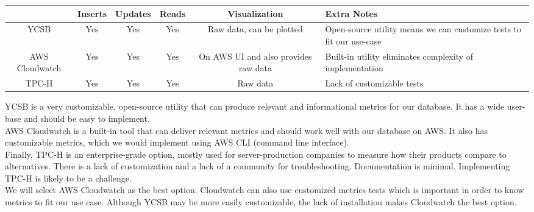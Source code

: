 \documentclass[10pt,draftclsnofoot,onecolumn,journal,compsoc]{IEEEtran}
\begin{document}
        \begin{table}[ht]
        \begin{tabular}{|c|c|c|c|c|p{5cm}|}
            \hline
            \textbf{} & \textbf{Inserts} & \textbf{Updates} & \textbf{Reads} & \textbf{Visualization} & \textbf{Extra Notes}\\
            \hline
            YCSB & Yes & Yes & Yes & Raw data, can be plotted & Open-source utility means we can customize tests to fit our use-case\\
            \hline
            AWS Cloudwatch & Yes & Yes & Yes & On AWS UI and also provides raw data & Built-in utility eliminates complexity of implementation\\
            \hline
            TPC-H & Yes & Yes & Yes & Raw data &Lack of customizable tests\\
            \hline
        \end{tabular}
        \end{table}
       
        \noindent YCSB is a very customizable, open-source utility that can produce relevant and informational metrics for our database. It has a wide user-base and should be easy to implement. \\
    
        \noindent AWS Cloudwatch is a built-in tool that can deliver relevant metrics and should work well with our database on AWS. It also has customizable metrics, which we would implement using AWS CLI (command line interface).\\ 
        
        \noindent Finally, TPC-H is an enterprise-grade option, mostly used for server-production companies to measure how their products compare to alternatives. There is a lack of customization and a lack of a community for troubleshooting. Documentation is minimal. Implementing TPC-H is likely to be a challenge.\\
        
        \noindent We will select AWS Cloudwatch as the best option. Cloudwatch can also use customized metrics tests which is important in order to know metrics to fit our use case. Although YCSB may be more easily customizable, the lack of installation makes Cloudwatch the best option.
\end{document}
